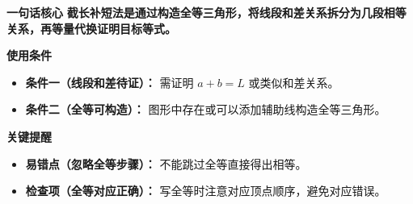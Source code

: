 \begin{summarybox}
	\textbf{\textcolor{CSummary}{一句话核心}}
	\textbf{截长补短法是通过构造全等三角形，将线段和差关系拆分为几段相等关系，再等量代换证明目标等式。}

	\medskip
	\textbf{\textcolor{CSummary}{使用条件}}
	\begin{itemize}[leftmargin=*, itemsep=0.5em, topsep=0.4em]
		\item \textbf{条件一（线段和差待证）：} 需证明 $a+b=L$ 或类似和差关系。
		\item \textbf{条件二（全等可构造）：} 图形中存在或可以添加辅助线构造全等三角形。
	\end{itemize}

	\medskip
	\textbf{\textcolor{CSummary}{关键提醒}}
	\begin{itemize}[leftmargin=*, itemsep=0.5em, topsep=0.4em]
		\item \textbf{易错点（忽略全等步骤）：} 不能跳过全等直接得出相等。
		\item \textbf{检查项（全等对应正确）：} 写全等时注意对应顶点顺序，避免对应错误。
	\end{itemize}

\end{summarybox}
